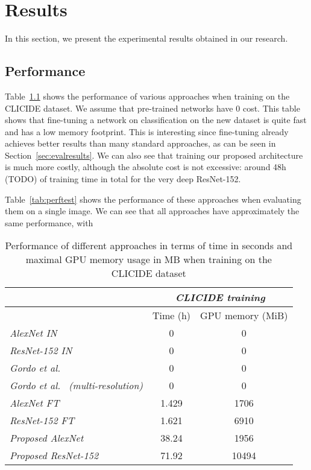 
\chapter{Results}
In this section, we present the experimental results obtained in our
research.

\section{Performance}\label{sec:perfresults}
Table~\ref{tab:perftrain} shows the performance of various approaches
when training on the CLICIDE dataset. We assume that pre-trained
networks have 0 cost. This table shows that fine-tuning a network
on classification on the new dataset is quite fast and has a low memory
footprint. This is interesting since fine-tuning already achieves better
results than many standard approaches, as can be seen in
Section~\ref{sec:evalresults}.
We can also see that training our proposed architecture is much
more costly, although the absolute cost is not excessive:
around 48h (TODO) of training time in total for the very deep ResNet-152.

Table~\ref{tab:perftest} shows the performance of these approaches
when evaluating them on a single image. We can see that all approaches
have approximately the same performance, with %

\begin{table}
\begin{tabular}{|l|c|c|}
\hline & \multicolumn{2}{c|}{\emph{CLICIDE training}}\\
\hline & Time (h) & GPU memory (MiB)\\
\hline \emph{AlexNet IN} & 0 & 0\\
\hline \emph{ResNet-152 IN} & 0 & 0\\
\hline \emph{Gordo et al.~\cite{gordo_deep_2016}} & 0 & 0\\
\hline \emph{Gordo et al.~\cite{gordo_deep_2016} (multi-resolution)}
& 0 & 0\\
\hline \emph{AlexNet FT} & 1.429 & 1706\\
\hline \emph{ResNet-152 FT} & 1.621 & 6910\\
\hline \emph{Proposed AlexNet} & 38.24 & 1956\\
\hline \emph{Proposed ResNet-152} & 71.92 & 10494\\
\hline
\end{tabular}
\caption{Performance of different approaches in terms of time in seconds and
maximal GPU memory usage in MB when training on the CLICIDE dataset
\label{tab:perftrain}}
\end{table}

